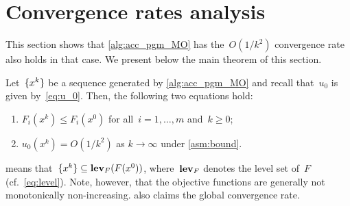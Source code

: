 \documentclass[../main]{subfiles}
\begin{document}
\section{Convergence rates analysis} \label{sec:acc_pgm:rate}
This section shows that \cref{alg:acc_pgm_MO} has the~$O(1 / k^2)$ convergence rate also holds in that case.
We present below the main theorem of this section.
\begin{theorem} \label{thm:main theorem of stepsize section}
    Let~$\lbrace x^k\rbrace$ be a sequence generated by \cref{alg:acc_pgm_MO} and recall that~$u_0$ is given by~\cref{eq:u_0}.
    Then, the following two equations hold:
    \begin{enumerate}
    \item $F_i(x^k) \le F_i(x^0)$ for all~$i = 1, \dots, m$ and~$k \ge 0$; \label{thm:main theorem of stepsize section:less than x0}
    \item $u_0(x^k) = O(1 / k^2)$ as $k \to \infty$ under \cref{asm:bound}. \label{thm:main theomrem of stepsize section:O(1/k2)}
    \end{enumerate}
\end{theorem}
 means that~$\lbrace x^k\rbrace \subseteq \operatorname{\mathbf{lev}}_F(F(x^0))$, where~$\operatorname{\mathbf{lev}}_F$ denotes the level set of~$F$ (cf.~\cref{eq:level}).
Note, however, that the objective functions are generally not monotonically non-increasing.
 also claims the global convergence rate.
\end{document}
